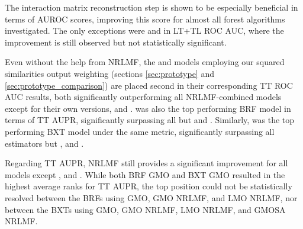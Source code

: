 The interaction matrix reconstruction step is shown to be especially beneficial in terms of AUROC scores, improving this score for almost all forest algorithms investigated. The only exceptions were  and  in LT+TL ROC AUC, where the improvement is still observed but not statistically significant.
%
%

Even without the help from NRLMF, the  and  models employing our squared similarities output weighting (sections \autoref{sec:prototype} and \autoref{sec:prototype_comparison}) are placed second in their corresponding TT ROC AUC results, both significantly outperforming all NRLMF-combined models except for their own versions,  and . %
 was also the top performing BRF model in terms of TT AUPR, significantly surpassing all but  and .
Similarly,  was the top performing BXT model under the same metric, significantly surpassing all estimators but ,  and .

Regarding TT AUPR, NRLMF still provides a significant improvement for all models except ,  and . While both BRF GMO and BXT GMO resulted in the highest average ranks for TT AUPR, the top position could not be statistically resolved between the BRFs using GMO, GMO NRLMF, and LMO NRLMF, nor between the BXTs using GMO, GMO NRLMF, LMO NRLMF, and GMOSA NRLMF.

